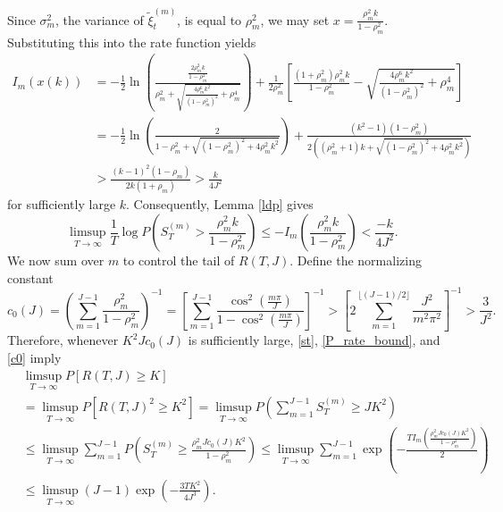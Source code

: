 \documentclass[12pt]{amsart}
\numberwithin{equation}{section}
\newcommand{\1}{\mathbf{1}}
\begin{document}
Since $\sigma_m^2$, the variance of $\tilde{\xi}_t^{(m)}$, is equal to $\rho_m^2$, we may set $x=\frac{\rho_m^2k}{1-\rho_m^2}$. Substituting this into the rate function yields
\begin{align*}
    I_{m}(x(k))&=-\frac{1}{2}\ln\left(\frac{\frac{2\rho_m^2k}{1-\rho_m^2}}{\rho^2_m+\sqrt{\frac{4\rho_m^6k^2}{(1-\rho_m^2)^2}+\rho_m^4}}\right)+\frac{1}{2\rho_m^2}\left[\frac{(1+\rho_m^2)\rho_m^2k}{1-\rho_m^2}-\sqrt{\frac{4\rho_m^6k^2}{(1-\rho_m^2)^2}+\rho_m^4}\right]\\
    &=-\frac{1}{2}\ln\left(\frac{2}{1-\rho_m^2+\sqrt{(1-\rho_m^2)^2+4\rho_m^2k^2}}\right)+\frac{(k^2-1)(1-\rho_m^2)}{2((\rho_m^2+1)k+\sqrt{(1-\rho_m^2)^2+4\rho_m^2k^2})}\\
    &>\frac{(k-1)^2(1-\rho_m)}{2k(1+\rho_m)}>\frac{k}{4J^2}
\end{align*}
for sufficiently large $k$. Consequently, Lemma \ref{ldp} gives
\begin{equation}
\label{P_rate_bound}
    \limsup_{T\to\infty}\frac{1}{T}\log P\left(S^{(m)}_T>\frac{\rho_m^2k}{1-\rho_m^2}\right)\leq -I_m\left(\frac{\rho_m^2k}{1-\rho_m^2}\right)<\frac{-k}{4J^2}.
\end{equation}
We now sum over $m$ to control the tail of $R(T,J)$. Define the normalizing constant
\begin{equation}
\label{c0}
    c_0(J)=\left(\sum_{m=1}^{J-1}\frac{\rho_m^2}{{1-\rho_m^2}}\right)^{-1}= \left[\sum_{m=1}^{J-1}\frac{\cos^2\left(\frac{m\pi}{J}\right)}{1-\cos^2\left(\frac{m\pi}{J}\right)}\right]^{-1}>\left[2\sum_{m=1}^{\lfloor (J-1)/2\rfloor}\frac{J^2}{m^2\pi^2}\right]^{-1}>\frac{3}{J^2}.
\end{equation}
Therefore, whenever $K^2Jc_0(J)$ is sufficiently large, \eqref{st}, \eqref{P_rate_bound}, and \eqref{c0} imply
\begin{equation*}
\begin{split}
\label{tailP}
        &\limsup_{T\to\infty}P[R(T,J)\geq K] \\
        &= \limsup_{T\to\infty}P\left[R(T,J)^2\geq K^2\right]=\limsup_{T\to\infty}P\left(\sum_{m=1}^{J-1}S_T^{(m)}\geq JK^2\right)\\
    &\leq \limsup_{T\to\infty}\sum_{m=1}^{J-1}P\left(S_T^{(m)}\geq\frac{\rho_m^2Jc_0(J)K^2}{1-\rho_m^2}\right)\leq\limsup_{T\to\infty}\sum_{m=1}^{J-1}\exp\left(-\frac{TI_m\left(\frac{\rho_m^2Jc_0(J)K^2}{1-\rho_m^2}\right)}{2}\right)\\
    &\leq \limsup_{T\to\infty}(J-1)\exp\left(-\frac{3TK^2}{4J^{3}}\right).
\end{split}
\end{equation*}
\end{document}

